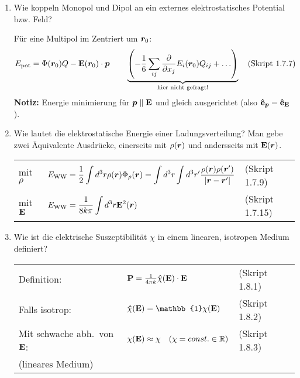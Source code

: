 \begin{enumerate}
  \item Wie koppeln Monopol und Dipol an ein externes elektrostatisches %
        Potential bzw. Feld?
        
        Für eine Multipol im Zentriert um $\vb* r_0$:
        $$E_{\text{pot}}=\Phi(\vb* r_0)Q-\vb E(\vb* r_0)\cdot\vb* p 
        \qquad
        \underbrace{\qty(-\frac{1}{6}\sum_{ij}\pdv{x_j}E_i(\vb* r_0)Q_{ij}
        +\ldots)}_{\text{hier nicht gefragt!}}
        \quad\text{(Skript 1.7.7)}$$
        \textbf{Notiz:} Energie minimierung für $\vb* p\parallel \vb E$
        und gleich ausgerichtet (also $\vu e_{\vb* p}=\vu e_{\vb E}$).\\

  \clearpage
  \item Wie lautet die elektrostatische Energie einer Ladungsverteilung? %
        Man gebe zwei Äquivalente Ausdrücke, einerseits mit $\rho(\vb* r)$
        und andersseits mit $\vb E(\vb* r)$.
        \begin{center}
        \begin{tabular}{lll}
          mit $\rho$    
          & $\displaystyle E_{\text{WW}}=
            \frac{1}{2}\int d^3 r\rho(\vb* r)
            \Phi_\rho(\vb* r)
            =\int d^3r\int d^3r' 
            \frac{\rho(\vb*r)\rho(\vb*r')}{\abs{\vb*r-\vb*r'}} $
              &(Skript 1.7.9)\\
          mit $\vb E$   & $\displaystyle E_{\text{WW}}=\frac{1}{8k\pi}
                           \int d^3 r\vb E^2(\vb* r)$
                            &(Skript 1.7.15)\\
        \end{tabular}
        \end{center}

  \item Wie ist die elektrische Suszeptibilität $\chi$ in einem  %
        linearen, isotropen Medium definiert?
        \begin{center}
        \begin{tabular}{lll}
          Definition:             
          & $\vb P = \frac{1}{4\pi k} 
            \vu \chi(\vb E)\cdot \vb E\quad$
          & (Skript 1.8.1) \\
          Falls isotrop: 
          & $\vu\chi(\vb E)=
            \mathbb{1}\chi(\vb E)$
          & (Skript 1.8.2) \\
          Mit schwache abh.\ von $\vb E$:
          & $\chi(\vb E)\approx\chi
          \quad(\chi=const.\in\mathbb{R})$
            & (Skript 1.8.3) \\
          (lineares Medium)
        \end{tabular}
        \end{center}


\end{enumerate}
